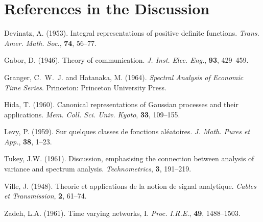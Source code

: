 \documentclass[12pt]{article}
\theoremstyle{definition}
\theoremstyle{plain}
\theoremstyle{remark}
\begin{document}
\section*{References in the Discussion}
\begin{thebibliography}{99}
Devinatz, A. (1953). Integral representations of positive definite functions. \emph{Trans. Amer. Math. Soc.}, \textbf{74}, 56--77.

Gabor, D. (1946). Theory of communication. \emph{J. Inst. Elec. Eng.}, \textbf{93}, 429--459.

Granger, C.~W.~J. and Hatanaka, M. (1964). \emph{Spectral Analysis of Economic Time Series}. Princeton: Princeton University Press.

Hida, T. (1960). Canonical representations of Gaussian processes and their applications. \emph{Mem. Coll. Sci. Univ. Kyoto}, \textbf{33}, 109--155.

Levy, P. (1959). Sur quelques classes de fonctions aléatoires. \emph{J. Math. Pures et App.}, \textbf{38}, 1--23.

Tukey, J.W. (1961). Discussion, emphasising the connection between analysis of variance and spectrum analysis. \emph{Technometrics}, \textbf{3}, 191--219.

Ville, J. (1948). Theorie et applications de la notion de signal analytique. \emph{Cables et Transmission}, \textbf{2}, 61--74.

Zadeh, L.A. (1961). Time varying networks, I. \emph{Proc. I.R.E.}, \textbf{49}, 1488--1503.
\end{thebibliography}
\end{document}
